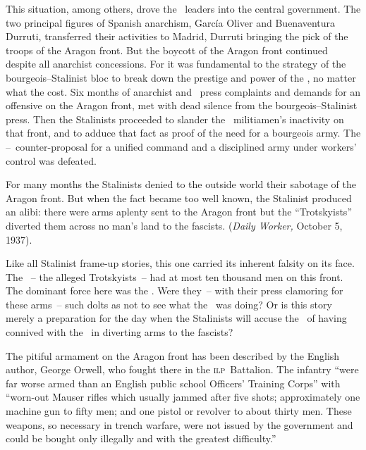 \indexCNT
This situation, among others, drove the \CNT\ leaders into the central government. The two principal figures of Spanish anarchism, Garc\'ia Oliver and Buenaventura Durruti, transferred their activities to Madrid, Durruti bringing the pick of the troops of the Aragon front. But the boycott of the Aragon front continued despite all anarchist concessions. For it was fundamental to the strategy of the bourgeois--Stalinist bloc to break down the prestige and power of the \CNT\kn, no matter what the cost. Six months of anarchist and \POUM\ press complaints and demands for an offensive on the Aragon front, met with dead silence from the bourgeois--Stalinist press. Then the Stalinists proceeded to slander the \CNT\ militiamen’s inactivity on that front, and to adduce that fact as proof of the need for a bourgeois army. The \CNT--\POUM\ counter-proposal for a unified command and a disciplined army under workers’ control was defeated.

\indexPOUM{}
For many months the Stalinists denied to the outside world their sabotage of the Aragon front. But when the fact became too well known, the Stalinist produced an alibi: there were arms aplenty sent to the Aragon front but the ``Trotskyists'' diverted them across no man’s land to the fascists. (\emph{Daily Worker,} October 5, 1937).

Like all Stalinist frame-up stories, this one carried its inherent falsity on its face. The \POUM~-- the alleged Trotskyists~-- had at most ten thousand men on this front. The dominant force here was the \CNT\kn. Were they~-- with their press clamoring for these arms~-- such dolts as not to see what the \POUM\ was doing? Or is this story merely a preparation for the day when the Stalinists will accuse the \CNT\ of having connived with the \POUM\ in diverting arms to the fascists?
\indexCNT

The pitiful armament on the Aragon front has been described by the English author, George Orwell, who fought there in the \textsc{ilp}~Battalion. The infantry ``were far worse armed than an English public school Officers’ Training Corps'' with ``worn-out Mauser rifles which usually jammed after five shots; approximately one machine gun to fifty men; and one pistol or revolver to about thirty men. These weapons, so necessary in trench warfare, were not issued by the government and could be bought only illegally and with the greatest difficulty.\kn\kn''

